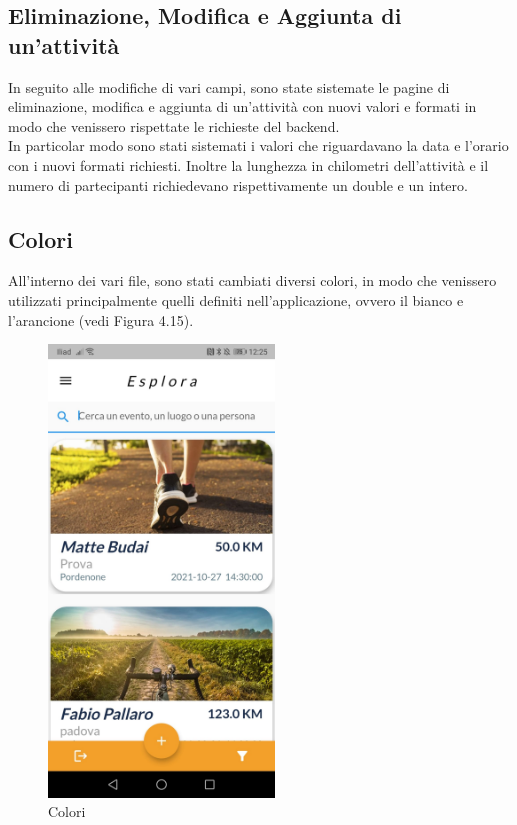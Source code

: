 \subsection{Eliminazione, Modifica e Aggiunta di un'attività}
In seguito alle modifiche di vari campi, sono state sistemate le pagine di eliminazione, modifica e aggiunta di un'attività con nuovi valori e formati in modo che venissero rispettate le richieste del backend.\\
In particolar modo sono stati sistemati i valori che riguardavano la data e l'orario con i nuovi formati richiesti. Inoltre la lunghezza in  chilometri dell'attività e il numero di partecipanti richiedevano rispettivamente un double e un intero.

\subsection{Colori}
All'interno dei vari file, sono stati cambiati diversi colori, in modo che venissero utilizzati principalmente quelli definiti nell'applicazione, ovvero il bianco e l'arancione (vedi Figura 4.15).\\

\begin{figure}[htbp]	
	\centering
	\includegraphics[width=6cm]{immagini/colori.jpeg}
	\caption{Colori}
	\label{fig:Colori}
\end{figure}

\newpage

